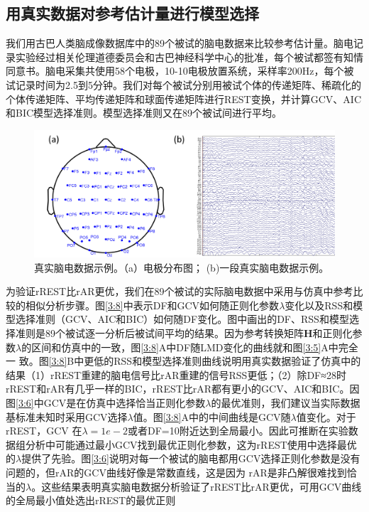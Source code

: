 \subsection{用真实数据对参考估计量进行模型选择}
我们用古巴人类脑成像数据库中的89个被试的脑电数据来比较参考估计量。脑电记录实验经过相关伦理道德委员会和古巴神经科学中心的批准，每个被试都签有知情同意书。脑电采集共使用58个电极，10-10电极放置系统，采样率200Hz，每个被试记录时间为2.5到5分钟。我们对每个被试分别用被试个体的传递矩阵、稀疏化的个体传递矩阵、平均传递矩阵和球面传递矩阵进行REST变换，并计算GCV、AIC和BIC模型选择准则。模型选择准则又在89个被试间进行平均。 
\begin{figure}[!h]
	\centering
	\includegraphics[width=15cm]{pic/Frontier/figure7.png}
	\caption{真实脑电数据示例。（a）电极分布图； (b)一段真实脑电数据示例。}
	\label{3:7}
\end{figure}
为验证rREST比rAR更优，我们在89个被试的实际脑电数据中采用与仿真中参考比较的相似分析步骤。图\ref{3:8}中表示DF和GCV如何随正则化参数$\lambda$变化以及RSS和模型选择准则（GCV、AIC和BIC）如何随DF变化。图中画出的DF、RSS和模型选择准则是89个被试逐一分析后被试间平均的结果。因为参考转换矩阵$\mathbf{H}$和正则化参数$\lambda$的区间和仿真中的一致，图\ref{3:8}A中DF随LMD变化的曲线就和图\ref{3:5}A中完全一
致。图\ref{3:8}B中更低的RSS和模型选择准则曲线说明用真实数据验证了仿真中的结果（1）rREST重建的脑电信号比rAR重建的信号RSS更低；（2）除DF≈28时rREST和rAR有几乎一样的BIC，rREST比rAR都有更小的GCV、AIC和BIC。因图\ref{3:6}中GCV是在仿真中选择恰当正则化参数$\lambda$的最优准则，我们建议当实际数据基标准未知时采用GCV选择$\lambda$值。图\ref{3:8}A中的中间曲线是GCV随$\lambda$值变化。对于rREST，GCV
在$\lambda=1e-2$或者DF=10附近达到全局最小。因此可推断在实验数据组分析中可能通过最小GCV找到最优正则化参数，这为rREST使用中选择最优
的$\lambda$提供了先验。图\ref{3:6}说明对每一个被试的脑电都用GCV选择正则化参数是没有问题的，但rAR的GCV曲线好像是常数直线，这是因为
rAR是非凸解很难找到恰当的$\lambda$。这些结果表明真实脑电数据分析验证了rREST比rAR更优，可用GCV曲线的全局最小值处选出rREST的最优正则
